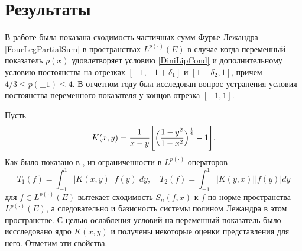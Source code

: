 

\section{Результаты}

В работе \cite{tad-SHII-Leg} была показана сходимость частичных сумм Фурье-Лежандра  \eqref{FourLegPartialSum} в пространствах $L^{p(\cdot)}(E)$ в случае когда переменный показатель $p(x)$ удовлетворяет условию \eqref{DiniLipCond} и дополнительному условию постоянства на отрезках $[-1,-1+\delta_1]$ и $[1-\delta_2,1]$, причем $4/3\le p(\pm1)\le4$. В отчетном году был исследован вопрос устранения условия постоянства переменного показателя у концов отрезка $[-1,1]$.

Пусть
\begin{equation}
K(x,y)=\frac{1}{x-y}\Biggl[ \Bigl(\frac{1-y^2}{1-x^2} \Bigr)^\frac14 - 1 \Biggr].
\end{equation}
Как было показано в \cite{tad-SHII-Leg}, из ограниченности в $L^{p(\cdot)}$ операторов
\begin{equation}\label{T1T2-def}
T_1(f)=\int_{-1}^1 |K(x,y)||f(y)|dy, \quad
T_2(f)=\int_{-1}^1 |K(y,x)||f(y)|dy
\end{equation}
для $f\in L^{p(\cdot)}(E)$ вытекает сходимость $S_n(f,x)$ к $f$ по норме пространства $L^{p(\cdot)}(E)$, а следовательно и базисность системы полином Лежандра в этом пространстве. С целью ослабления условий на переменный показатель было иссследовано ядро $K(x,y)$ и получены некоторые оценки представления для него. Отметим эти свойства.

